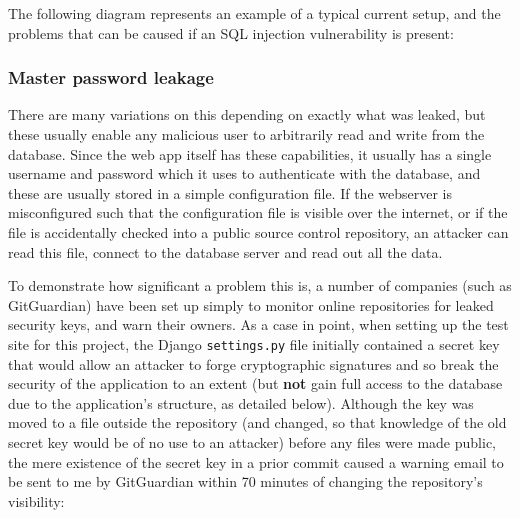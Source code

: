\documentclass{article}
\begin{document}
The following diagram represents an example of a typical current setup, and the problems that can be caused if an SQL injection vulnerability is present:


\subsubsection{Master password leakage}
There are many variations on this depending on exactly what was leaked, but these usually enable any malicious user to arbitrarily read and write from the database. Since the web app itself has these capabilities, it usually has a single username and password which it uses to authenticate with the database, and these are usually stored in a simple configuration file. If the webserver is misconfigured such that the configuration file is visible over the internet, or if the file is accidentally checked into a public source control repository, an attacker can read this file, connect to the database server and read out all the data.

To demonstrate how significant a problem this is, a number of companies (such as GitGuardian\cite{GitGuardian}) have been set up simply to monitor online repositories for leaked security keys, and warn their owners. As a case in point, when setting up the test site for this project, the Django \texttt{settings.py} file initially contained a secret key that would allow an attacker to forge cryptographic signatures and so break the security of the application to an extent (but \textbf{not} gain full access to the database due to the application's structure, as detailed below). Although the key was moved to a file outside the repository (and changed, so that knowledge of the old secret key would be of no use to an attacker) before any files were made public, the mere existence of the secret key in a prior commit caused a warning email to be sent to me by GitGuardian within 70 minutes of changing the repository's visibility:
\end{document}
